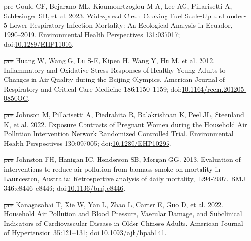 \documentclass[
  letterpaper,
  DIV=11,
  numbers=noendperiod]{scrartcl}
\newlength{\cslhangindent}
\newenvironment{CSLReferences}[2] %
 {\begin{list}{}{%
  \setlength{\itemindent}{0pt} %
  \setlength{\leftmargin}{0pt} %
  \setlength{\parsep}{0pt} %
  \ifodd #1
   \setlength{\leftmargin}{\cslhangindent} %
   \setlength{\itemindent}{-1\cslhangindent} %
  \fi
  \setlength{\itemsep}{#2\baselineskip}}} %
 {\end{list}} %
\providecommand{\DIFdel}[1]{{\protect\color{red}\sout{#1}}}                      %
\providecommand{\DIFaddbegin}{} %
\providecommand{\DIFaddend}{} %
\providecommand{\DIFdelbegin}{} %
\providecommand{\DIFdelend}{} %
\newcommand{\DIFscaledelfig}{0.5}
\newlength{\DIFdelgraphicswidth} %
\newlength{\DIFdelgraphicsheight} %
\newcommand{\DIFaddincludegraphics}[2][]{{\color{blue}\fbox{\DIFOincludegraphics[#1]{#2}}}} %
\newcommand{\DIFdelincludegraphics}[2][]{%
\sbox{\DIFdelgraphicsbox}{\DIFOincludegraphics[#1]{#2}}%
\settoboxwidth{\DIFdelgraphicswidth}{\DIFdelgraphicsbox} %
\settoboxtotalheight{\DIFdelgraphicsheight}{\DIFdelgraphicsbox} %
\scalebox{\DIFscaledelfig}{%
\parbox[b]{\DIFdelgraphicswidth}{\usebox{\DIFdelgraphicsbox}\\[-\baselineskip] \rule{\DIFdelgraphicswidth}{0em}}\llap{\resizebox{\DIFdelgraphicswidth}{\DIFdelgraphicsheight}{%
\setlength{\unitlength}{\DIFdelgraphicswidth}%
\begin{picture}(1,1)%
\thicklines\linethickness{2pt} %
{\color[rgb]{1,0,0}\put(0,0){\framebox(1,1){}}}%
{\color[rgb]{1,0,0}\put(0,0){\line( 1,1){1}}}%
{\color[rgb]{1,0,0}\put(0,1){\line(1,-1){1}}}%
\end{picture}%
}\hspace*{3pt}}} %
} %
\DeclareRobustCommand{\DIFaddbegin}{\DIFOaddbegin \let\includegraphics\DIFaddincludegraphics} %
\DeclareRobustCommand{\DIFaddend}{\DIFOaddend \let\includegraphics\DIFOincludegraphics} %
\DeclareRobustCommand{\DIFdelbegin}{\DIFOdelbegin \let\includegraphics\DIFdelincludegraphics} %
\DeclareRobustCommand{\DIFdelend}{\DIFOaddend \let\includegraphics\DIFOincludegraphics} %
\begin{document}
\begin{CSLReferences}{1}{1}
\DIFdelbegin %
\DIFdel{pre}%
\DIFdelend \DIFaddbegin {}
\DIFaddend Gould CF, Bejarano ML, Kioumourtzoglou M-A, Lee AG, Pillarisetti A,
Schlesinger SB, et al. 2023. Widespread {Clean Cooking Fuel Scale-Up}
and under-5 {Lower Respiratory Infection Mortality}: {An Ecological
Analysis} in {Ecuador}, 1990--2019. Environmental Health Perspectives
131:037017;
doi:\href{https://doi.org/10.1289/EHP11016}{10.1289/EHP11016}.

\DIFdelbegin %
\DIFdel{pre}%
\DIFdelend \DIFaddbegin {}
\DIFaddend Huang W, Wang G, Lu S-E, Kipen H, Wang Y, Hu M, et al. 2012.
Inflammatory and {Oxidative Stress Responses} of {Healthy Young Adults}
to {Changes} in {Air Quality} during the {Beijing Olympics}. American
Journal of Respiratory and Critical Care Medicine 186:1150--1159;
doi:\href{https://doi.org/10.1164/rccm.201205-0850OC}{10.1164/rccm.201205-0850OC}.

\DIFdelbegin %
\DIFdel{pre}%
\DIFdelend \DIFaddbegin {}
\DIFaddend Johnson M, Pillarisetti A, Piedrahita R, Balakrishnan K, Peel JL,
Steenland K, et al. 2022. Exposure {Contrasts} of {Pregnant Women}
during the {Household Air Pollution Intervention Network Randomized
Controlled Trial}. Environmental Health Perspectives 130:097005;
doi:\href{https://doi.org/10.1289/EHP10295}{10.1289/EHP10295}.

\DIFdelbegin %
\DIFdel{pre}%
\DIFdelend \DIFaddbegin {}
\DIFaddend Johnston FH, Hanigan IC, Henderson SB, Morgan GG. 2013. Evaluation of
interventions to reduce air pollution from biomass smoke on mortality in
{Launceston}, {Australia}: Retrospective analysis of daily mortality,
1994-2007. BMJ 346:e8446--e8446;
doi:\href{https://doi.org/10.1136/bmj.e8446}{10.1136/bmj.e8446}.

\DIFdelbegin %
\DIFdel{pre}%
\DIFdelend \DIFaddbegin {}
\DIFaddend Kanagasabai T, Xie W, Yan L, Zhao L, Carter E, Guo D, et al. 2022.
Household {Air Pollution} and {Blood Pressure}, {Vascular Damage}, and
{Subclinical Indicators} of {Cardiovascular Disease} in {Older Chinese
Adults}. American Journal of Hypertension 35:121--131;
doi:\href{https://doi.org/10.1093/ajh/hpab141}{10.1093/ajh/hpab141}.


\end{CSLReferences}
\end{document}
